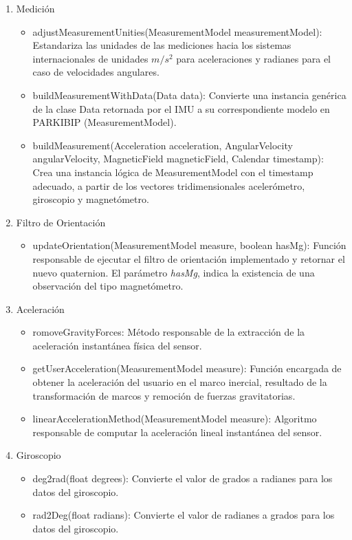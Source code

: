 \begin{enumerate}
    \item Medición
    \begin{itemize}
        \item adjustMeasurementUnities(MeasurementModel measurementModel): Estandariza las unidades de las mediciones hacia los sistemas internacionales de unidades $m/s^2$ para aceleraciones y radianes para el caso de velocidades angulares.
        \item buildMeasurementWithData(Data data): Convierte una instancia genérica de la clase Data retornada por el IMU a su correspondiente modelo en PARKIBIP (MeasurementModel).
        \item buildMeasurement(Acceleration acceleration, AngularVelocity angularVelocity, MagneticField magneticField, Calendar timestamp): Crea una instancia lógica de MeasurementModel con el timestamp adecuado, a partir de los vectores tridimensionales acelerómetro, giroscopio y magnetómetro.
    \end{itemize}
    \item Filtro de Orientación
    \begin{itemize}
        \item updateOrientation(MeasurementModel measure, boolean hasMg): Función responsable de ejecutar el filtro de orientación implementado y retornar el nuevo quaternion. El parámetro \textit{hasMg}, indica la existencia de una observación del tipo magnetómetro.
    \end{itemize}
\item Aceleración  
\begin{itemize}
    \item romoveGravityForces: Método responsable de la extracción de la aceleración instantánea física del sensor.
    \item getUserAcceleration(MeasurementModel measure): Función encargada de obtener la aceleración del usuario en el marco inercial, resultado de la transformación de marcos y remoción de fuerzas gravitatorias.
    \item linearAccelerationMethod(MeasurementModel measure): Algoritmo responsable de computar la aceleración lineal instantánea del sensor.
\end{itemize}
\item Giroscopio
\begin{itemize}
     \item deg2rad(float degrees): Convierte el valor de grados a radianes para los datos del giroscopio.
    \item rad2Deg(float radians): Convierte el valor de radianes a grados para los datos del giroscopio.

\end{itemize}
\end{enumerate}
